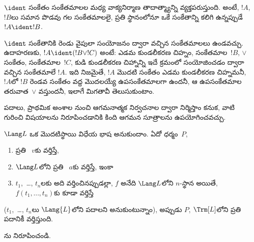 \documentclass[../../../include/open-logic-section]{subfiles}
\begin{document}
\begin{defn}[వాక్యనిర్మాణ తాదాత్మ్యం]
$\ident$ సంకేతం సంకేతమాలల మధ్య వాక్యనిర్మాణ తాదాత్మ్యాన్ని
వ్యక్తపరుస్తుంది. అంటే, $!A$, $!B$లు సమాన పొడవు గల సంకేతమాలలై,
ప్రతి స్థానంలోనూ ఒకే సంకేతాన్ని కలిగి ఉన్నప్పుడే
$!A \ident !B$.
\end{defn}

$\ident$ సంకేతానికి రెండు వైపులా సంయోజనం ద్వారా వచ్చిన సంకేతమాలలు
ఉండవచ్చు. ఉదాహరణకు, $!A \ident (!B \lor !C)$ అంటే: ఎడమ కుండలీకరణ
చిహ్నం, సంకేతమాల~$!B$, $\lor$ సంకేతం, సంకేతమాల~$!C$, కుడి కుండలీకరణ
చిహ్నాన్ని ఇదే క్రమంలో సంయోజించడం ద్వారా వచ్చిన సంకేతమాలే $!A$.
ఇది నిజమైతే, $!A$ మొదటి సంకేతం ఎడమ కుండలీకరణ చిహ్నమనీ, $!A$లో
$!B$ రెండవ సంకేతం వద్ద మొదలయ్యే ఉపసంకేతమాలగా ఉందనీ, ఆ ఉపసంకేతమాల
తరువాత~$\lor$ వస్తుందనీ, ఇలాగే మిగతావీ తెలుసుకుంటాం.

పదాలు,  ప్రాథమిక అంశాల నుంచి ఆగమనాత్మక నిర్వచనాల ద్వారా
నిర్మిస్తాం కనుక, వాటి గురించి విషయాలను నిరూపించడానికి కింది ఆగమన
సూత్రాలను ఉపయోగించవచ్చు.

\begin{lem}
    $\Lang L$ ఒక మొదటిస్థాయి విధేయ భాష అనుకుందాం.
    ఏదో ధర్మం~$P$,
    \begin{enumerate}
        \item ప్రతి ~$v$కు వర్తిస్తే,
        \item $\Lang L$లోని ప్రతి ~$a$కు వర్తిస్తే, ఇంకా
        \item $t_1$,~\dots, $t_n$లకు అది వర్తించినప్పుడల్లా,
        $f$ అనేది $\Lang L$లోని $n$-స్థాన  అయితే,
        $f(t_1,\dotsc,t_n)$కు కూడా వర్తిస్తే
    \end{enumerate}
    ($t_1$,~\dots, $t_n$లు $\Lang{L}$లోని పదాలని అనుకుంటున్నాం),
    అప్పుడు $P$, $\Trm[L]$లోని ప్రతి పదానికీ వర్తిస్తుంది.
\end{lem}

\begin{prob}
    ను నిరూపించండి.
\end{prob}
\end{document}
